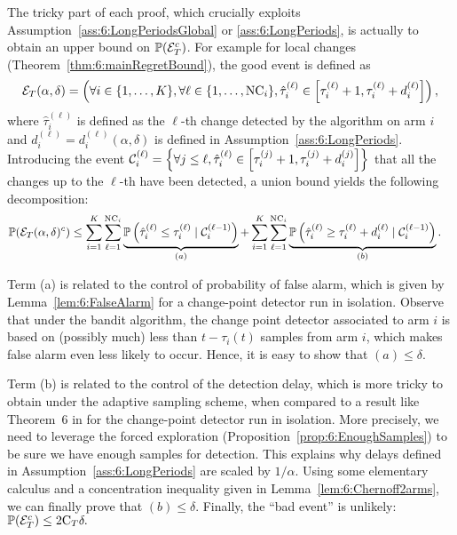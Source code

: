 The tricky part of each proof, which crucially exploits Assumption~\ref{ass:6:LongPeriodsGlobal} or \ref{ass:6:LongPeriods}, is actually to obtain an upper bound on $\mathbb{P}(\mathcal{E}_T^c)$. For example for local changes (Theorem~\ref{thm:6:mainRegretBound}), the good event is defined as
\[
    \mathcal{E}_T(\alpha,\delta) = \left(\forall i \in \{1, \ldots, K\}, \forall \ell \in \{1, \ldots, \text{NC}_i\}, \hat{\tau}^{(\ell)}_i \in \left[\tau_i^{(\ell)} + 1, \tau_i^{(\ell)} + d_i^{(\ell)}\right] \right),
\]
where $\hat\tau_i^{(\ell)}$ is defined as the $\ell$-th change detected by the algorithm on arm $i$ and $d_i^{(\ell)}=d_i^{(\ell)}(\alpha,\delta)$ is defined in Assumption~\ref{ass:6:LongPeriods}. Introducing the event $\mathcal{C}_i^{(\ell)} = \left\{\forall j \leq \ell, \hat\tau_i^{(\ell)} \in \left[\tau_i^{(j)} + 1, \tau_i^{(j)} + d_i^{(j)} \right] \right\}$ that all the changes up to the $\ell$-th have been detected, a union bound yields the following decomposition:
\begin{align*}
    \mathbb{P}(\mathcal{E}_T(\alpha,\delta)^c) & \leq \sum\limits_{i=1}^K\sum\limits_{\ell=1}^{\text{NC}_i} \underbrace{\mathbb{P}\left(\hat\tau_i^{(\ell)} \leq \tau_i^{(\ell)} \;|\; \mathcal{C}_i^{(\ell-1)}\right)}_{(a)} + \sum\limits_{i=1}^K\sum\limits_{\ell=1}^{\text{NC}_i} \underbrace{\mathbb{P}\left(\hat\tau_i^{(\ell)} \geq \tau_i^{(\ell)} + d_i^{(\ell)} \;|\; \mathcal{C}_i^{(\ell-1)}\right)}_{(b)}.
\end{align*}

Term (a) is related to the control of probability of false alarm, which is given by Lemma~\ref{lem:6:FalseAlarm} for a change-point detector run in isolation.
Observe that under the bandit algorithm, the change point detector associated to arm $i$ is based on (possibly much) less than $t - \tau_i(t)$ samples from arm $i$, which makes false alarm even less likely to occur. Hence, it is easy to show that $(a) \leq \delta$.

Term (b) is related to the control of the detection delay, which is more tricky to obtain under the \GLRklUCB{} adaptive sampling scheme,
when compared to a result like Theorem~6 in \cite{Maillard2018GLR} for the change-point detector run in isolation.
%
More precisely, we need to leverage the forced exploration (Proposition~\ref{prop:6:EnoughSamples}) to be sure we have enough samples for detection. This explains why delays defined in Assumption~\ref{ass:6:LongPeriods} are scaled by $1/\alpha$.
Using some elementary calculus and a concentration inequality given in Lemma~\ref{lem:6:Chernoff2arms}, we can finally prove that $(b) \leq \delta$.
%
Finally, the ``bad event'' is unlikely: $\mathbb{P}(\mathcal{E}_T^c) \leq 2\mathrm{C}_T \delta.$


